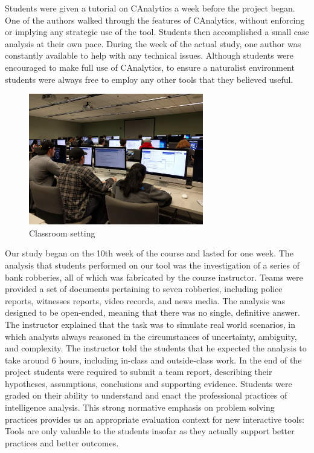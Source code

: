 Students were given a tutorial on CAnalytics a week before the project began.
One of the authors walked through the features of CAnalytics, without enforcing or implying any strategic use of the tool. Students then accomplished a small case analysis at their own pace. During the week of the
actual study, one author was constantly available to help with any technical
issues. Although students were encouraged to make full use of CAnalytics, to
ensure a naturalist environment students were always free to employ any other
tools that they believed useful.

\begin{figure} \centering
\includegraphics[width=3in]{./img/classroom_setting.jpg} \caption{Classroom
setting}\label{fig:classroom} \end{figure}

Our study began on the 10th week of the course and lasted for one week. The
analysis that students performed on our tool was the investigation of a series
of bank robberies, all of which was fabricated by the course instructor. Teams
were provided a set of documents pertaining to seven robberies, including police
reports, witnesses reports, video records, and news media. The analysis was
designed to be open-ended, meaning that there was no single, definitive answer.
The instructor explained that the task was to simulate real world scenarios, in
which analysts always reasoned in the circumstances of uncertainty, ambiguity,
and complexity. The instructor told the students that he expected the analysis
to take around 6 hours, including in-class and outside-class work. In the end of
the project students were required to submit a team report, describing their
hypotheses, assumptions, conclusions and supporting evidence.
Students were graded on their ability to
understand and enact the professional practices of intelligence analysis. This
strong normative emphasis on problem solving practices provides us an
appropriate evaluation context for new interactive tools: Tools are only
valuable to the students insofar as they actually support better practices and
better outcomes.

